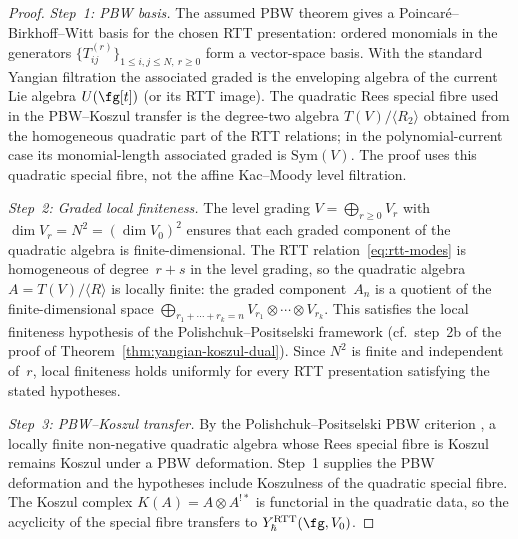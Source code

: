 \begin{proof}
\emph{Step~1: PBW basis.}
The assumed PBW theorem gives a Poincar\'{e}--Birkhoff--Witt basis for
the chosen RTT presentation: ordered monomials in the generators
$\{T_{ij}^{(r)}\}_{1\le i,j\le N,\ r\ge0}$ form a vector-space
basis.  With the standard Yangian filtration the associated graded is
the enveloping algebra of the current Lie algebra
$U(\fg[t])$ (or its RTT image).  The quadratic Rees special fibre used
in the PBW--Koszul transfer is the degree-two algebra
$T(V)/\langle R_2\rangle$ obtained from the homogeneous quadratic part
of the RTT relations; in the polynomial-current case its
monomial-length associated graded is $\mathrm{Sym}(V)$.  The proof uses
this quadratic special fibre, not the affine Kac--Moody level
filtration.

\emph{Step~2: Graded local finiteness.}
The level grading $V = \bigoplus_{r \geq 0} V_r$ with
$\dim V_r = N^2 = (\dim V_0)^2$ ensures that each graded component
of the quadratic algebra is finite-dimensional. The RTT
relation~\eqref{eq:rtt-modes} is homogeneous of degree~$r+s$ in the
level grading, so the quadratic algebra
$A = T(V)/\langle R \rangle$ is locally finite: the graded
component~$A_n$ is a quotient of the finite-dimensional space
$\bigoplus_{r_1 + \cdots + r_k = n} V_{r_1} \otimes \cdots
\otimes V_{r_k}$. This satisfies the local finiteness hypothesis
of the Polishchuk--Positselski framework
(cf.\ step~2b of the proof of
Theorem~\ref{thm:yangian-koszul-dual}). Since
$N^2$ is finite and independent of~$r$, local finiteness
holds uniformly for every RTT presentation satisfying the stated
hypotheses.

\emph{Step~3: PBW--Koszul transfer.}
By the Polishchuk--Positselski PBW criterion \cite[Ch.~4]{PP05}, a
locally finite non-negative quadratic algebra whose Rees special
fibre is Koszul remains Koszul under a PBW deformation.  Step~1
supplies the PBW deformation and the hypotheses include Koszulness of
the quadratic special fibre.  The Koszul complex
$K(A)=A\otimes A^{!\ast}$ is functorial in the quadratic data, so the
acyclicity of the special fibre transfers to
$Y_{\hbar}^{\mathrm{RTT}}(\fg,V_0)$.
\end{proof}

